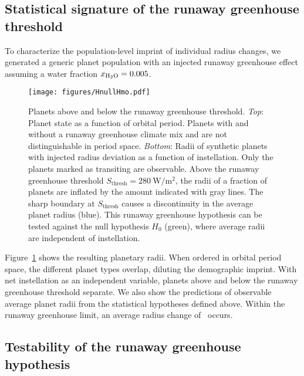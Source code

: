 \documentclass[modern]{aastex631}
\begin{document}
\subsection{Statistical signature of the runaway greenhouse threshold}
To characterize the population-level imprint of individual radius changes, we generated a generic planet population with an injected runaway greenhouse effect assuming a water fraction $x_\mathrm{H_2O} = 0.005$.
\begin{figure}
    \begin{centering}
        \texttt{[image: figures/HnullHmo.pdf]}
        \caption{Planets above and below the runaway greenhouse threshold.
        \textit{Top}: Planet state as a function of orbital period. Planets with and without a runaway greenhouse climate mix and are not distinguishable in period space.
        \textit{Bottom}: Radii of synthetic planets with injected radius deviation as a function of instellation. Only the planets marked as transiting are observable. Above the runaway greenhouse threshold $S_\mathrm{thresh} =\SI{280}{\watt\per\meter\squared} $, the radii of a fraction of planets are inflated by the amount indicated with gray lines. The sharp boundary at $S_\mathrm{thresh}$ causes a discontinuity in the average planet radius (blue). This runaway greenhouse hypothesis can be tested against the null hypothesis $H_0$ (green), where average radii are independent of instellation.}
        \label{fig:HnullHmo}
    \end{centering}
\end{figure}
Figure~\ref{fig:HnullHmo} shows the resulting planetary radii.
When ordered in orbital period space, the different planet types overlap, diluting the demographic imprint.
With net instellation as an independent variable, planets above and below the runaway greenhouse threshold separate.
We also show the predictions of observable average planet radii from the statistical hypotheses defined above.
Within the runaway greenhouse limit, an average radius change of \avgRadiusChange\ occurs.


\subsection{Testability of the runaway greenhouse hypothesis}
\end{document}
